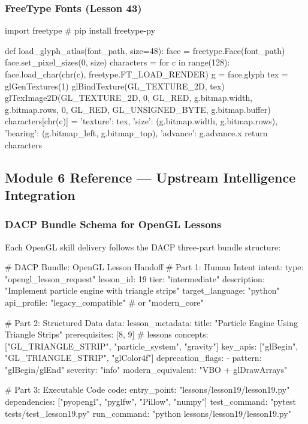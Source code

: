 \documentclass[11pt,letterpaper]{article}
\begin{document}
\subsubsection{FreeType Fonts (Lesson 43)}

\begin{codebox}
import freetype  # pip install freetype-py

def load_glyph_atlas(font_path, size=48):
    face = freetype.Face(font_path)
    face.set_pixel_sizes(0, size)
    characters = {}
    for c in range(128):
        face.load_char(chr(c), freetype.FT_LOAD_RENDER)
        g = face.glyph
        tex = glGenTextures(1)
        glBindTexture(GL_TEXTURE_2D, tex)
        glTexImage2D(GL_TEXTURE_2D, 0, GL_RED,
                     g.bitmap.width, g.bitmap.rows, 0,
                     GL_RED, GL_UNSIGNED_BYTE, g.bitmap.buffer)
        characters[chr(c)] = {
            'texture': tex, 'size': (g.bitmap.width, g.bitmap.rows),
            'bearing': (g.bitmap_left, g.bitmap_top),
            'advance': g.advance.x
        }
    return characters
\end{codebox}

\subsection{Module 6 Reference --- Upstream Intelligence Integration}

\subsubsection{DACP Bundle Schema for OpenGL Lessons}

Each OpenGL skill delivery follows the DACP three-part bundle structure:

\begin{codebox}
# DACP Bundle: OpenGL Lesson Handoff
# Part 1: Human Intent
intent:
  type: "opengl_lesson_request"
  lesson_id: 19
  tier: "intermediate"
  description: "Implement particle engine with triangle strips"
  target_language: "python"
  api_profile: "legacy_compatible"  # or "modern_core"

# Part 2: Structured Data
data:
  lesson_metadata:
    title: "Particle Engine Using Triangle Strips"
    prerequisites: [8, 9]  # lessons
    concepts: ["GL_TRIANGLE_STRIP", "particle_system", "gravity"]
    key_apis: ["glBegin", "GL_TRIANGLE_STRIP", "glColor4f"]
  deprecation_flags:
    - pattern: "glBegin/glEnd"
      severity: "info"
      modern_equivalent: "VBO + glDrawArrays"

# Part 3: Executable Code
code:
  entry_point: "lessons/lesson19/lesson19.py"
  dependencies: ["pyopengl", "pyglfw", "Pillow", "numpy"]
  test_command: "pytest tests/test_lesson19.py"
  run_command: "python lessons/lesson19/lesson19.py"
\end{codebox}
\end{document}
